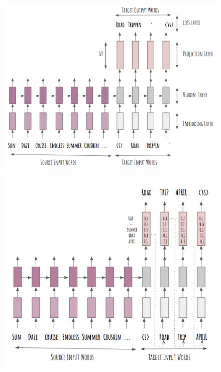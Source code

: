 \documentclass{article} %
\begin{document}
\begin{figure}
    \centering
    \begin{minipage}[b]{.49\linewidth}
        \centering
            \includegraphics[trim={0.3cm 0cm 0cm 1cm}, clip, width=\textwidth]{train-arch.png}
        \label{fig:standard_arch}
    \end{minipage}%
    \hfill%
    \begin{minipage}[b]{.49\linewidth}
    \centering
        \centering
            \includegraphics[trim={0cm, 0.5cm, 0cm, 2cm}, clip, width=\textwidth]{infer-arch.png}

\end{minipage}
\end{figure}
\end{document}
